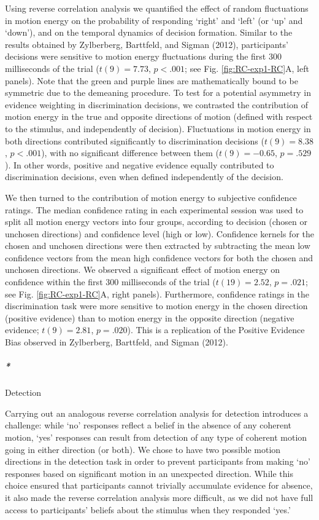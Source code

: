 \documentclass[
  english,
  man]{apa6}
\let\oldsubparagraph\subparagraph
\renewcommand{\subparagraph}[1]{\oldsubparagraph{#1}\mbox{}}
\begin{document}
Using reverse correlation analysis we quantified the effect of random fluctuations in motion energy on the probability of responding `right' and `left' (or `up' and `down'), and on the temporal dynamics of decision formation. Similar to the results obtained by Zylberberg, Barttfeld, and Sigman (2012), participants' decisions were sensitive to motion energy fluctuations during the first 300 milliseconds of the trial (\(t(9) = 7.73\), \(p < .001\); see Fig. \ref{fig:RC-exp1-RC}A, left panels). Note that the green and purple lines are mathematically bound to be symmetric due to the demeaning procedure. To test for a potential asymmetry in evidence weighting in discrimination decisions, we contrasted the contribution of motion energy in the true and opposite directions of motion (defined with respect to the stimulus, and independently of decision). Fluctuations in motion energy in both directions contributed significantly to discrimination decisions (\(t(9) = 8.38\), \(p < .001\)), with no significant difference between them (\(t(9) = -0.65\), \(p = .529\)). In other words, positive and negative evidence equally contributed to discrimination decisions, even when defined independently of the decision.

We then turned to the contribution of motion energy to subjective confidence ratings. The median confidence rating in each experimental session was used to split all motion energy vectors into four groups, according to decision (chosen or unchosen directions) and confidence level (high or low). Confidence kernels for the chosen and unchosen directions were then extracted by subtracting the mean low confidence vectors from the mean high confidence vectors for both the chosen and unchosen directions. We observed a significant effect of motion energy on confidence within the first 300 milliseconds of the trial (\(t(19) = 2.52\), \(p = .021\); see Fig. \ref{fig:RC-exp1-RC}A, right panels). Furthermore, confidence ratings in the discrimination task were more sensitive to motion energy in the chosen direction (positive evidence) than to motion energy in the opposite direction (negative evidence; \(t(9) = 2.81\), \(p = .020\)). This is a replication of the Positive Evidence Bias observed in Zylberberg, Barttfeld, and Sigman (2012).

\hypertarget{detection}{%
\subparagraph*{Detection}\label{detection}}

Carrying out an analogous reverse correlation analysis for detection introduces a challenge: while `no' responses reflect a belief in the absence of any coherent motion, `yes' responses can result from detection of any type of coherent motion going in either direction (or both). We chose to have two possible motion directions in the detection task in order to prevent participants from making `no' responses based on significant motion in an unexpected direction. While this choice ensured that participants cannot trivially accumulate evidence for absence, it also made the reverse correlation analysis more difficult, as we did not have full access to participants' beliefs about the stimulus when they responded `yes.'
\end{document}

